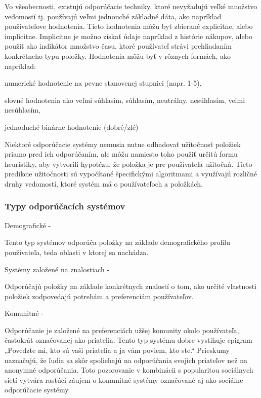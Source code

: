 Vo všeobecnosti, existujú odporúčacie techniky, ktoré nevyžadujú veľké množstvo vedomostí tj. používajú veľmi jednouché základné dáta, ako napríklad používateľove hodnotenia. Tieto hodnotenia môžu byť zbierané explicitne, alebo implicitne. Implicitne je možno získať údaje napríklad z histórie nákupov, alebo použiť ako indikátor množstvo času, ktoré používateľ strávi prehliadaním konkrétneho typu položky. Hodnotenia môžu byť v rôznych formách, ako napríklad: \cite{rs1}
 \begin{itemize}[leftmargin=*]
{\item numerické hodnotenie na pevne stanovenej stupnici (napr. 1-5),} 
{\item slovné hodnotenia ako veľmi súhlasím, súhlasím, neutrálny, nesúhlasím, veľmi nesúhlasím,} 
{\item jednoduché binárne hodnotenie (dobré/zlé)} \cite{rs1}
\end{itemize} 

Niektoré odporúčacie systémy nemusia nutne odhadovať užitočnosť položiek priamo pred ich odporúčaním, ale môžu namiesto toho použiť určitú formu heuristiky, aby vytvorili hypotézu, že položka je pre používateľa užitočná. Tieto predikcie užitočnosti sú vypočítané špecifickými algoritmami a využívajú rozličné druhy vedomostí, ktoré systém má o používateľoch a položkách. \cite{rs1} \\

\subsubsection{Typy odporúčacích systémov}
\begin{itemize}[leftmargin=*]
{\bf \item Demografické - }Tento typ systémov odporúča položky na základe demografického
profilu používateľa, teda oblasti v ktorej sa nachádza. 
{\bf \item Systémy založené na znalostiach - }Odporúčajú položky na základe konkrétnych znalostí o tom, ako určité vlastnosti položiek zodpovedajú potrebám a preferenciám používateľov.
{\bf \item Komunitné - }Odporúčanie je založené na preferenciách užšej komunity okolo používateľa, častokrát označovanej ako priatelia. Tento typ systému dobre vystihuje epigram „Povedzte mi, kto sú vaši priatelia a ja vám poviem, kto ste.“ Prieskumy naznačujú, že ľudia sa skôr spoliehajú na odporúčania svojich priateľov než na anonymné odporúčania. \cite{communityrec} Toto pozorovanie v kombinácii s popularitou sociálnych sietí vytvára rastúci záujem o komunitné systémy označované aj ako sociálne odporúčacie systémy. \cite{rs1}\\
\end{itemize} 
 
